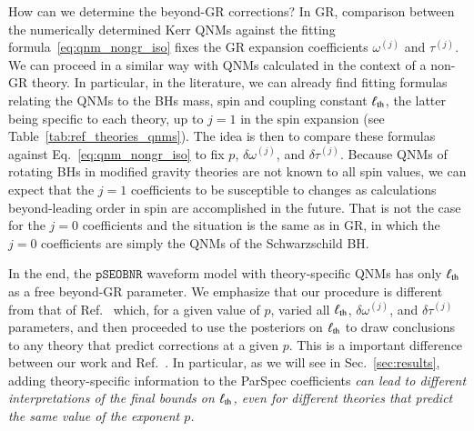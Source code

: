 \documentclass[twocolumn,
               prd,
               aps,
               superscriptaddress,
               tightenlines,
               nofootinbib,
               eqsecnum,
               amsfonts,
               amsmath,
               longbibliography]{revtex4-1}
\newcommand{\pSEOB}{\texttt{pSEOBNR}}
\begin{document}
How can we determine the beyond-GR corrections? In GR, comparison between the numerically determined
Kerr QNMs against the fitting formula~\eqref{eq:qnm_nongr_iso} fixes the GR expansion coefficients
$\omega^{(j)}$ and $\tau^{(j)}$.
%
We can proceed in a similar way with QNMs calculated in the context of a non-GR theory.
%
In particular, in the literature, we can already find fitting formulas relating
the QNMs to the BHs mass, spin and coupling constant $\ell_{\rm th}$, the latter being
specific to each theory, up to $j=1$ in the spin expansion (see Table~\ref{tab:ref_theories_qnms}).
%
The idea is then to compare these formulas against Eq.~\eqref{eq:qnm_nongr_iso}
to fix $p$, $\delta\omega^{(j)}$, and $\delta\tau^{(j)}$.
%
Because QNMs of rotating BHs in modified gravity theories are not known to
all spin values, we can expect that the $j=1$ coefficients to be susceptible to
changes as calculations beyond-leading order in spin are accomplished in the future.
%
That is not the case for the $j=0$ coefficients and the situation is the same as in GR,
in which the $j=0$ coefficients are simply the QNMs of the Schwarzschild BH.

In the end, the $\pSEOB$ waveform model with theory-specific
QNMs has only $\ell_{\rm th}$ as a free beyond-GR parameter.
%
We emphasize that our procedure is different from that of
Ref.~\cite{Carullo:2021dui} which, for a given value of $p$, varied all $\ell_{\rm th}$,
$\delta\omega^{(j)}$, and $\delta\tau^{(j)}$ parameters, and then proceeded
to use the posteriors on $\ell_{\rm th}$ to draw conclusions to any theory that predict
corrections at a given $p$.
%
This is a important difference between our work and Ref.~\cite{Carullo:2021dui}.
In particular, as we will see in Sec.~\ref{sec:results}, adding theory-specific
information to the ParSpec coefficients \emph{can lead to different interpretations
of the final bounds on $\ell_{\rm th}$, even for different theories that predict the same
value of the exponent $p$.}
\end{document}
